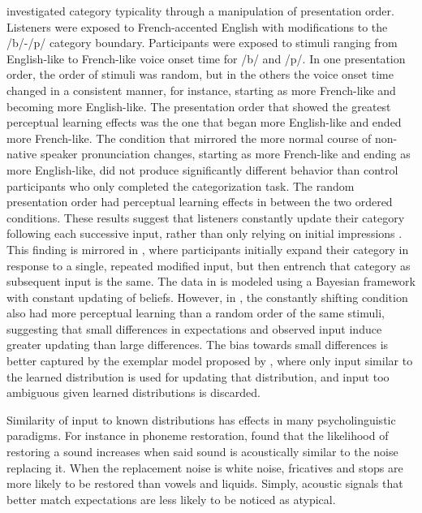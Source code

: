 \citet{Sumner2011} investigated category typicality through a manipulation of presentation order. 
Listeners were exposed to French-accented English with modifications to the /b/-/p/ category boundary.
Participants were exposed to stimuli ranging from English-like to French-like voice onset time for /b/ and /p/.
In one presentation order, the order of stimuli was random, but in the others the voice onset time changed in a consistent manner, for instance, starting as more French-like and becoming more English-like.
The presentation order that showed the greatest perceptual learning effects was the one that began more English-like and ended more French-like.
The condition that mirrored the more normal course of non-native speaker pronunciation changes, starting as more French-like and ending as more English-like, did not produce significantly different behavior than control participants who only completed the categorization task.
The random presentation order had perceptual learning effects in between the two ordered conditions.
These results suggest that listeners constantly update their category following each successive input, rather than only relying on initial impressions \citep[contra][]{Kraljic2008}.
This finding is mirrored in \citet{Vroomen2007}, where participants initially expand their category in response to a single, repeated modified input, but then entrench that category as subsequent input is the same.
The data in \citet{Vroomen2007} is modeled using a Bayesian framework with constant updating of beliefs.
However, in \citet{Sumner2011}, the constantly shifting condition also had more perceptual learning than a random order of the same stimuli, suggesting that small differences in expectations and observed input induce greater updating than large differences.
The bias towards small differences is better captured by the exemplar model proposed by \citet{Pierrehumbert2001}, where only input similar to the learned distribution is used for updating that distribution, and input too ambiguous given learned distributions is discarded.

Similarity of input to known distributions has effects in many psycholinguistic paradigms.
For instance in phoneme restoration, \citet{Samuel1981} found that the likelihood of restoring a sound increases when said sound is acoustically similar to the noise replacing it.  
When the replacement noise is white noise, fricatives and stops are more likely to be restored than vowels and liquids.
Simply, acoustic signals that better match expectations are less likely to be noticed as atypical.

